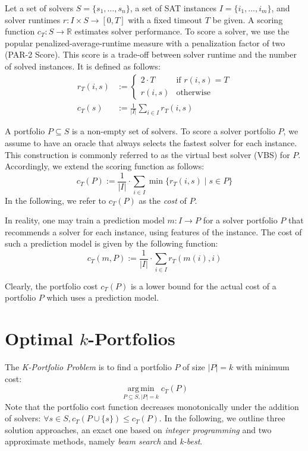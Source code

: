 \documentclass[runningheads]{llncs}
\DeclareMathOperator*{\argmin}{arg\,min}
\begin{document}
Let a set of solvers $S = \{s_1, \dots, s_n\}$, a set of SAT instances $I = \{i_1, \dots, i_m\}$, and solver runtimes $r: I \times S \rightarrow [0, T]$ with a fixed timeout $T$ be given.
A scoring function $c_T: S \rightarrow \mathbb{R}$ estimates solver performance. 
To score a solver, we use the popular penalized-average-runtime measure with a penalization factor of two (PAR-2 Score). 
This score is a trade-off between solver runtime and the number of solved instances.
It is defined as follows:%
\begin{align}
r_T(i,s) &:= \begin{cases}
	2 \cdot T & \text{if }r(i,s) = T\\
	r(i,s) & \text{otherwise}
\end{cases} \tag*{Penalized Runtimes}\\[.5em]
c_T(s) &:= \frac{1}{|I|} \sum_{i \in I}{r_T(i,s)} \tag*{PAR-2 Score}
\end{align}

A portfolio $P \subseteq S$ is a non-empty set of solvers.
To score a solver portfolio $P$, we assume to have an oracle that always selects the fastest solver for each instance. 
This construction is commonly referred to as the virtual best solver (VBS) for $P$. 
Accordingly, we extend the scoring function as follows:%
$$
	c_{T}(P) := \frac{1}{|I|} \cdot \sum\limits_{i \in I}{\min\{r_T(i,s) \mid s \in P\}}
$$
In the following, we refer to $c_{T}(P)$ as the \emph{cost} of $P$. 

In reality, one may train a prediction model $m : I \rightarrow P$ for a solver portfolio $P$ that recommends a solver for each instance, using features of the instance. 
The cost of such a prediction model is given by the following function:%
$$
	c_{T}(m,P) := \frac{1}{|I|} \cdot \sum\limits_{i \in I}{r_T(m(i),i)}
$$

Clearly, the portfolio cost $c_{T}(P)$ is a lower bound for the actual cost of a portfolio $P$ which uses a prediction model.

\section{Optimal \texorpdfstring{$k$}{k}-Portfolios} %
\label{sec:approach}

The \emph{K-Portfolio Problem} is to find a portfolio $P$ of size $|P| = k$ with minimum cost:%
$$
\argmin\limits_{P \subseteq S, |P| = k} c_{T}(P)
$$
Note that the portfolio cost function decreases monotonically under the addition of solvers: $\forall s \in S, c_{T}(P \cup \{s\}) \leq c_{T}(P)$. 
In the following, we outline three solution approaches, an exact one based on \emph{integer programming} and two approximate methods, namely \emph{beam search} and \emph{k-best}. 
\end{document}
